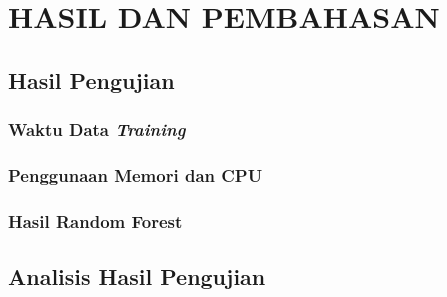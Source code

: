 \documentclass[ugmtesis]{ugmtesis}
\begin{document}






\chapter{HASIL DAN PEMBAHASAN}
\label{hasil dan pembahasan}

	\section{Hasil Pengujian}
	\label{hasil pengujian}
	

		\subsection{Waktu Data \textit{Training}}
		\label{waktu data training}
		

		\subsection{Penggunaan Memori dan CPU}
		\label{penggunaan memori dan cpu}
		

		\subsection{Hasil Random Forest}
		\label{performa random forest}
		

	\section{Analisis Hasil Pengujian}
	\label{analisis hasil pengujian}
	
\end{document}
